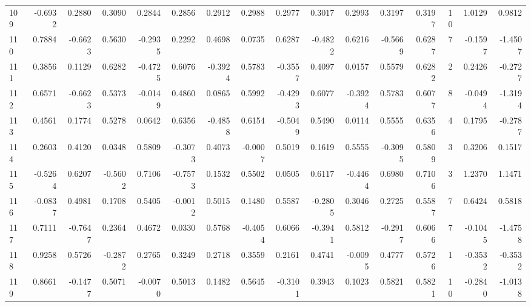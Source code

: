 \begin{tabular}{lrrrrrrrrrrrrrrr}
109 &     -0.6932 &  0.2880 &  0.3090 &  0.2844 &  0.2856 &  0.2912 &  0.2988 &  0.2977 &  0.3017 &  0.2993 &   0.3197 &     0.3197 &     10 &                    1.0129 &                     0.9812 \\
110 &      0.7884 & -0.6623 &  0.5630 & -0.2935 &  0.2292 &  0.4698 &  0.0735 &  0.6287 & -0.4822 &  0.6216 &  -0.5669 &     0.6287 &      7 &                   -0.1597 &                    -1.4507 \\
111 &      0.3856 &  0.1129 &  0.6282 & -0.4725 &  0.6076 & -0.3924 &  0.5783 & -0.3557 &  0.4097 &  0.0157 &   0.5579 &     0.6282 &      2 &                    0.2426 &                    -0.2727 \\
112 &      0.6571 & -0.6623 &  0.5373 & -0.0149 &  0.4860 &  0.0865 &  0.5992 & -0.4293 &  0.6077 & -0.3924 &   0.5783 &     0.6077 &      8 &                   -0.0494 &                    -1.3194 \\
113 &      0.4561 &  0.1774 &  0.5278 &  0.0642 &  0.6356 & -0.4858 &  0.6154 & -0.5049 &  0.5490 &  0.0114 &   0.5555 &     0.6356 &      4 &                    0.1795 &                    -0.2787 \\
114 &      0.2603 &  0.4120 &  0.0348 &  0.5809 & -0.3073 &  0.4073 & -0.0007 &  0.5019 &  0.1619 &  0.5555 &  -0.3095 &     0.5809 &      3 &                    0.3206 &                     0.1517 \\
115 &     -0.5264 &  0.6207 & -0.5602 &  0.7106 & -0.7573 &  0.1532 &  0.5502 &  0.0505 &  0.6117 & -0.4464 &   0.6980 &     0.7106 &      3 &                    1.2370 &                     1.1471 \\
116 &     -0.0837 &  0.4981 &  0.1708 &  0.5405 & -0.0012 &  0.5015 &  0.1480 &  0.5587 & -0.2805 &  0.3046 &   0.2725 &     0.5587 &      7 &                    0.6424 &                     0.5818 \\
117 &      0.7111 & -0.7647 &  0.2364 &  0.4672 &  0.0330 &  0.5768 & -0.4054 &  0.6066 & -0.3941 &  0.5812 &  -0.2917 &     0.6066 &      7 &                   -0.1045 &                    -1.4758 \\
118 &      0.9258 &  0.5726 & -0.2872 &  0.2765 &  0.3249 &  0.2718 &  0.3559 &  0.2161 &  0.4741 & -0.0095 &   0.4777 &     0.5726 &      1 &                   -0.3532 &                    -0.3532 \\
119 &      0.8661 & -0.1477 &  0.5071 & -0.0070 &  0.5013 &  0.1482 &  0.5645 & -0.3101 &  0.3943 &  0.1023 &   0.5821 &     0.5821 &     10 &                   -0.2840 &                    -1.0138 \\

\end{tabular}
